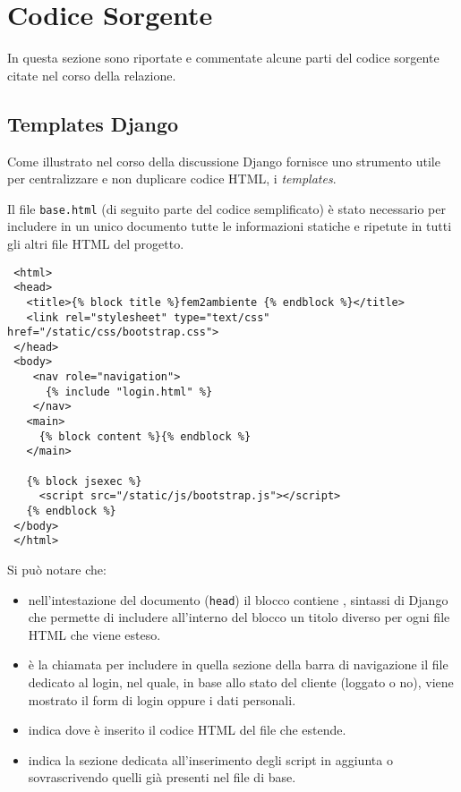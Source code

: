 \chapter{Codice Sorgente}
\label{app:codice}

In questa sezione sono riportate e commentate alcune parti del codice sorgente citate nel corso della relazione.

\section*{Templates Django}
\label{app:templates}

Come illustrato nel corso della discussione Django fornisce uno strumento utile per centralizzare e non duplicare codice HTML, i \emph{templates}.

Il file \texttt{base.html} (di seguito parte del codice semplificato) è stato necessario per includere in un unico documento tutte le informazioni statiche e ripetute in tutti gli altri file HTML del progetto.

\begin{footnotesize}
\begin{verbatim}
 <html>
 <head>
   <title>{% block title %}fem2ambiente {% endblock %}</title>
   <link rel="stylesheet" type="text/css" href="/static/css/bootstrap.css">
 </head>
 <body>
    <nav role="navigation">                        
      {% include "login.html" %}
    </nav>   
   <main>
     {% block content %}{% endblock %}
   </main>

   {% block jsexec %}
     <script src="/static/js/bootstrap.js"></script>
   {% endblock %}
 </body>
 </html>
\end{verbatim}
\end{footnotesize}

Si può notare che:
\begin{itemize}
 \item nell'intestazione del documento (\texttt{head}) il blocco  contiene , sintassi di Django che permette di includere all'interno del blocco un titolo diverso per ogni file HTML che viene esteso.
 \item {} è la chiamata per includere in quella sezione della barra di navigazione il file dedicato al login, nel quale, in base allo stato del cliente (loggato o no), viene mostrato il form di login oppure i dati personali.
 \item {} indica dove è inserito il codice HTML del file che estende.
 \item {} indica la sezione dedicata all'inserimento degli script {\js} in aggiunta o sovrascrivendo quelli già presenti nel file di base.
\end{itemize}

